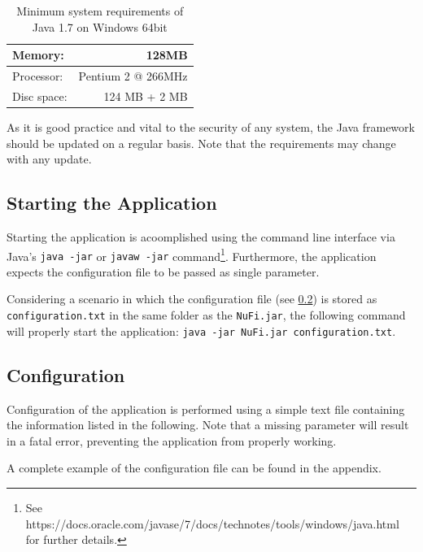 \documentclass[a4paper, 11pt]{article}
\newcommand{\code}[1]{\colorbox{codegray}{\texttt{#1}}}
\begin{document}
\begin{table}[h]
\centering
\begin{tabular}{ l | r }
Memory: & 128MB \\
\hline
Processor: & Pentium 2 @ 266MHz \\
\hline
Disc space: & 124 MB + 2 MB \\
\end{tabular}
\caption{Minimum system requirements of Java 1.7 on Windows 64bit}
\label{tab:system_requirements_java7}
\end{table}

As it is good practice and vital to the security of any system, the Java
framework should be updated on a regular basis. Note that the requirements may
change with any update.

\subsection{Starting the Application}
Starting the application is acoomplished using the command line interface via
Java's \code{java -jar} or \code{javaw -jar} command\footnote{See
https://docs.oracle.com/javase/7/docs/technotes/tools/windows/java.html for
further details.}. Furthermore, the application expects the configuration file
to be passed as single parameter.

Considering a scenario in which the configuration file (see \ref{sec:configuration}) is
stored as \code{configuration.txt} in the same folder as the \code{NuFi.jar}, the
following command will properly start the application:
\newline\code{java -jar NuFi.jar configuration.txt}.


\subsection{Configuration}\label{sec:configuration}
Configuration of the application is performed using a simple text file
containing the information listed in the following. Note that a missing
parameter will result in a fatal error, preventing the application from properly
working.

A complete example of the configuration file can be found in the appendix.
\end{document}
